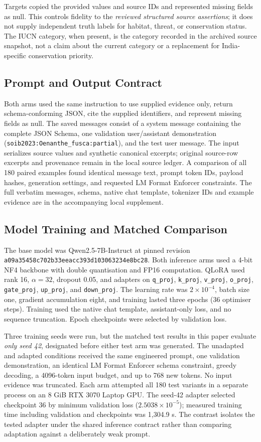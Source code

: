 \documentclass[a4paper,conference,10pt]{IEEEtran}
\begin{document}
Targets copied the provided values and source IDs and represented missing fields as null. This controls fidelity to the \emph{reviewed structured source assertions}; it does not supply independent truth labels for habitat, threat, or conservation status. The IUCN category, when present, is the category recorded in the archived source snapshot, not a claim about the current category or a replacement for India-specific conservation priority.

\subsection{Prompt and Output Contract}
Both arms used the same instruction to use supplied evidence only, return schema-conforming JSON, cite the supplied identifiers, and represent missing fields as null. The saved messages consist of a system message containing the complete JSON Schema, one validation user/assistant demonstration (\texttt{soib2023:Oenanthe\_fusca:partial}), and the test user message. The input serializes source values and synthetic canonical excerpts; original source-row excerpts and provenance remain in the local source ledger. A comparison of all 180 paired examples found identical message text, prompt token IDs, payload hashes, generation settings, and requested LM Format Enforcer constraints. The full verbatim messages, schema, native chat template, tokenizer IDs and example evidence are in the accompanying local supplement.

\subsection{Model Training and Matched Comparison}
The base model was Qwen2.5-7B-Instruct \cite{qwen} at pinned revision \texttt{a09a35458c702b33eeacc393d103063234e8bc28}. Both inference arms used a 4-bit NF4 backbone with double quantisation and FP16 computation. QLoRA used rank 16, $\alpha=32$, dropout 0.05, and adapters on \texttt{q\_proj}, \texttt{k\_proj}, \texttt{v\_proj}, \texttt{o\_proj}, \texttt{gate\_proj}, \texttt{up\_proj}, and \texttt{down\_proj}. The learning rate was $2\times10^{-4}$, batch size one, gradient accumulation eight, and training lasted three epochs (36 optimiser steps). Training used the native chat template, assistant-only loss, and no sequence truncation. Epoch checkpoints were selected by validation loss.

Three training seeds were run, but the matched test results in this paper evaluate \emph{only seed 42}, designated before either test arm was generated. The unadapted and adapted conditions received the same engineered prompt, one validation demonstration, an identical LM Format Enforcer schema constraint, greedy decoding, a 4096-token input budget, and up to 768 new tokens. No input evidence was truncated. Each arm attempted all 180 test variants in a separate process on an 8 GiB RTX 3070 Laptop GPU. The seed-42 adapter selected checkpoint 36 by minimum validation loss ($2.5038\times10^{-5}$); measured training time including validation and checkpoints was 1,304.9 s. The contrast isolates the tested adapter under the shared inference contract rather than comparing adaptation against a deliberately weak prompt.
\end{document}
